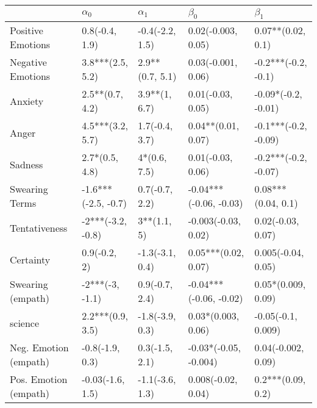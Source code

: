 \begin{tabular}{lllll}
\toprule
{} &           $\alpha_0$ &       $\alpha_1$ &               $\beta_0$ &             $\beta_1$ \\
\midrule
Positive Emotions     &       0.8(-0.4, 1.9) &  -0.4(-2.2, 1.5) &      0.02(-0.003, 0.05) &     0.07**(0.02, 0.1) \\
Negative Emotions     &     3.8***(2.5, 5.2) &  2.9**(0.7, 5.1) &      0.03(-0.001, 0.06) &   -0.2***(-0.2, -0.1) \\
Anxiety               &      2.5**(0.7, 4.2) &    3.9**(1, 6.7) &       0.01(-0.03, 0.05) &   -0.09*(-0.2, -0.01) \\
Anger                 &     4.5***(3.2, 5.7) &   1.7(-0.4, 3.7) &      0.04**(0.01, 0.07) &  -0.1***(-0.2, -0.09) \\
Sadness               &       2.7*(0.5, 4.8) &     4*(0.6, 7.5) &       0.01(-0.03, 0.06) &  -0.2***(-0.2, -0.07) \\
Swearing Terms        &  -1.6***(-2.5, -0.7) &   0.7(-0.7, 2.2) &  -0.04***(-0.06, -0.03) &    0.08***(0.04, 0.1) \\
Tentativeness         &    -2***(-3.2, -0.8) &      3**(1.1, 5) &     -0.003(-0.03, 0.02) &     0.02(-0.03, 0.07) \\
Certainty             &         0.9(-0.2, 2) &  -1.3(-3.1, 0.4) &     0.05***(0.02, 0.07) &    0.005(-0.04, 0.05) \\
Swearing (empath)     &      -2***(-3, -1.1) &   0.9(-0.7, 2.4) &  -0.04***(-0.06, -0.02) &    0.05*(0.009, 0.09) \\
science               &     2.2***(0.9, 3.5) &  -1.8(-3.9, 0.3) &      0.03*(0.003, 0.06) &    -0.05(-0.1, 0.009) \\
Neg. Emotion (empath) &      -0.8(-1.9, 0.3) &   0.3(-1.5, 2.1) &   -0.03*(-0.05, -0.004) &    0.04(-0.002, 0.09) \\
Pos. Emotion (empath) &     -0.03(-1.6, 1.5) &  -1.1(-3.6, 1.3) &      0.008(-0.02, 0.04) &     0.2***(0.09, 0.2) \\
\bottomrule
\end{tabular}
